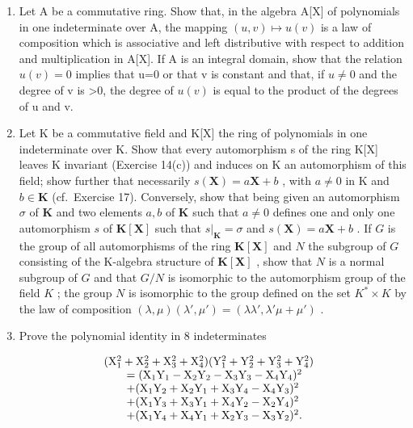 \begin{enumerate}
\def\labelenumi{\arabic{enumi}.}
\setcounter{enumi}{16}
\item
  Let A be a commutative ring. Show that, in the algebra A{[}X{]} of polynomials in one indeterminate over A, the mapping \((u,v)\mapsto u(v)\) is a law of composition which is associative and left distributive with respect to addition and multiplication in A{[}X{]}. If A is an integral domain, show that the relation \(u(v)=0\) implies that u=0 or that v is constant and that, if \(u\neq0\) and the degree of v is \textgreater0, the degree of \(u(v)\) is equal to the product of the degrees of u and v.
\item
  Let K be a commutative field and K{[}X{]} the ring of polynomials in one indeterminate over K. Show that every automorphism s of the ring K{[}X{]} leaves K invariant (Exercise 14(c)) and induces on K an automorphism of this field; show further that necessarily \(s(\mathbf{X}) = a\mathbf{X} + b\) , with \(a \neq 0\) in K and \(b \in \mathbf{K}\) (cf.~Exercise 17). Conversely, show that being given an automorphism \(\sigma\) of \(\mathbf{K}\) and two elements \(a, b\) of \(\mathbf{K}\) such that \(a \neq 0\) defines one and only one automorphism \(s\) of \(\mathbf{K}[\mathbf{X}]\) such that \(s|_{\mathbf{K}} = \sigma\) and \(s(\mathbf{X}) = a\mathbf{X} + b\) . If \(G\) is the group of all automorphisms of the ring \(\mathbf{K}[\mathbf{X}]\) and \(N\) the subgroup of \(G\) consisting of the K-algebra structure of \(\mathbf{K}[\mathbf{X}]\) , show that \(N\) is a normal subgroup of \(G\) and that \(G / N\) is isomorphic to the automorphism group of the field \(K\) ; the group \(N\) is isomorphic to the group defined on the set \(K^* \times K\) by the law of composition \((\lambda, \mu)(\lambda', \mu') = (\lambda\lambda', \lambda' \mu + \mu')\) .
\item
  Prove the polynomial identity in 8 indeterminates
\end{enumerate}

\[
\begin{array}{r l} & (\mathrm{X} _ {1} ^ {2} + \mathrm{X} _ {2} ^ {2} + \mathrm{X} _ {3} ^ {2} + \mathrm{X} _ {4} ^ {2}) (\mathrm{Y} _ {1} ^ {2} + \mathrm{Y} _ {2} ^ {2} + \mathrm{Y} _ {3} ^ {2} + \mathrm{Y} _ {4} ^ {2}) \\ & \qquad = (\mathrm{X} _ {1} \mathrm{Y} _ {1} - \mathrm{X} _ {2} \mathrm{Y} _ {2} - \mathrm{X} _ {3} \mathrm{Y} _ {3} - \mathrm{X} _ {4} \mathrm{Y} _ {4}) ^ {2} \\ & \qquad + (\mathrm{X} _ {1} \mathrm{Y} _ {2} + \mathrm{X} _ {2} \mathrm{Y} _ {1} + \mathrm{X} _ {3} \mathrm{Y} _ {4} - \mathrm{X} _ {4} \mathrm{Y} _ {3}) ^ {2} \\ & \qquad + (\mathrm{X} _ {1} \mathrm{Y} _ {3} + \mathrm{X} _ {3} \mathrm{Y} _ {1} + \mathrm{X} _ {4} \mathrm{Y} _ {2} - \mathrm{X} _ {2} \mathrm{Y} _ {4}) ^ {2} \\ & \qquad + (\mathrm{X} _ {1} \mathrm{Y} _ {4} + \mathrm{X} _ {4} \mathrm{Y} _ {1} + \mathrm{X} _ {2} \mathrm{Y} _ {3} - \mathrm{X} _ {3} \mathrm{Y} _ {2}) ^ {2}. \end{array}
\]

